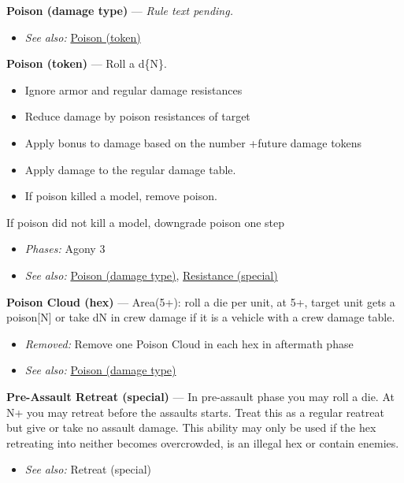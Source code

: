 \documentclass[a4paper,12pt]{article}
\begin{document}
\label{rule-damage-type-poison}%
\noindent\textbf{Poison (damage type)} --- \textit{Rule text pending.}\begin{itemize}
\item \textit{See also:} \hyperref[rule-token-poison]{Poison (token)}
\end{itemize}


\label{rule-token-poison}%
\noindent\textbf{Poison (token)} --- Roll a d\{N\}.
\begin{itemize}
\item Ignore armor and regular damage resistances
\item Reduce damage by poison resistances of target
\item Apply bonus to damage based on the number +future damage tokens
\item Apply damage to the regular damage table.
\item If poison killed a model, remove poison.
\end{itemize}

If poison did not kill a model, downgrade poison one step
\begin{itemize}
\item \textit{Phases:} Agony 3
\item \textit{See also:} \hyperref[rule-damage-type-poison]{Poison (damage type)}, \hyperref[rule-special-resistance]{Resistance (special)}
\end{itemize}


\label{rule-hex-poison-cloud}%
\noindent\textbf{Poison Cloud (hex)} --- Area(5+): roll a die per unit, at 5+, target unit gets a poison[N] or take dN in crew damage if it is a vehicle with a crew damage table.
\begin{itemize}
\item \textit{Removed:} Remove one Poison Cloud in each hex in aftermath phase
\item \textit{See also:} \hyperref[rule-damage-type-poison]{Poison (damage type)}
\end{itemize}


\label{rule-special-pre-assault-retreat}%
\noindent\textbf{Pre-Assault Retreat (special)} --- In pre-assault phase you may roll a die. At N+ you may retreat before the assaults starts. Treat this as a regular reatreat but give or take no assault damage. This ability may only be used if the hex retreating into neither becomes overcrowded, is an illegal hex or contain enemies.
\begin{itemize}
\item \textit{See also:} Retreat (special)
\end{itemize}
\end{document}
